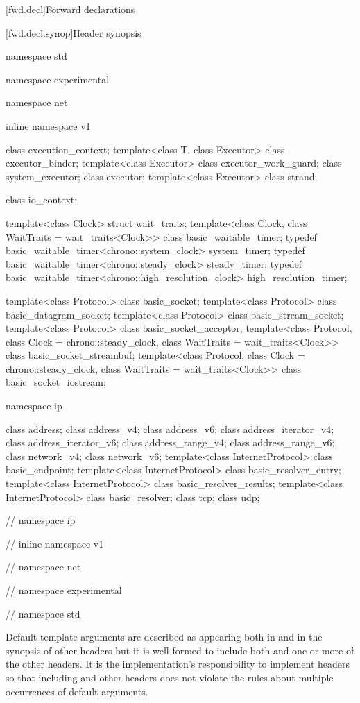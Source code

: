 
[fwd.decl]{Forward declarations}


[fwd.decl.synop]{Header  synopsis}

\begin{codeblock}
namespace std {
namespace experimental {
namespace net {
inline namespace v1 {

  class execution_context;
  template<class T, class Executor>
    class executor_binder;
  template<class Executor>
    class executor_work_guard;
  class system_executor;
  class executor;
  template<class Executor>
    class strand;

  class io_context;

  template<class Clock> struct wait_traits;
  template<class Clock, class WaitTraits = wait_traits<Clock>>
    class basic_waitable_timer;
  typedef basic_waitable_timer<chrono::system_clock> system_timer;
  typedef basic_waitable_timer<chrono::steady_clock> steady_timer;
  typedef basic_waitable_timer<chrono::high_resolution_clock> high_resolution_timer;

  template<class Protocol>
    class basic_socket;
  template<class Protocol>
    class basic_datagram_socket;
  template<class Protocol>
    class basic_stream_socket;
  template<class Protocol>
    class basic_socket_acceptor;
  template<class Protocol, class Clock = chrono::steady_clock,
    class WaitTraits = wait_traits<Clock>>
      class basic_socket_streambuf;
  template<class Protocol, class Clock = chrono::steady_clock,
    class WaitTraits = wait_traits<Clock>>
      class basic_socket_iostream;

  namespace ip {

    class address;
    class address_v4;
    class address_v6;
    class address_iterator_v4;
    class address_iterator_v6;
    class address_range_v4;
    class address_range_v6;
    class network_v4;
    class network_v6;
    template<class InternetProtocol>
      class basic_endpoint;
    template<class InternetProtocol>
      class basic_resolver_entry;
    template<class InternetProtocol>
      class basic_resolver_results;
    template<class InternetProtocol>
      class basic_resolver;
    class tcp;
    class udp;

  } // namespace ip
} // inline namespace v1
} // namespace net
} // namespace experimental
} // namespace std
\end{codeblock}

\pnum
Default template arguments are described as appearing both in 
and in the synopsis of other headers but it is well-formed to include both
 and one or more of the other headers.
\enternote It is the implementation's responsibility to implement headers so
that including  and other headers does not violate the rules
about multiple occurrences of default arguments. \exitnote



